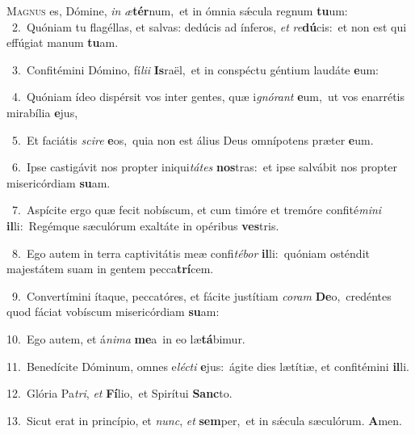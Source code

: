 \lettrine{\initial\textcolor{\initialcolor}{M}}{agnus} es, Dómine, \textit{in} \textit{æ}\-\textbf{tér}num,~\star et in ómnia sǽcula regnum \textbf{tu}\-um:\\
{\numbfont\textcolor{\numbcolor}{~2.}}~Quóniam tu flagéllas, et salvas: dedúcis ad ínferos, \textit{et} \textit{re}\-\textbf{dú}cis:~\star et non est qui effúgiat manum \textbf{tu}\-am.\par
{\numbfont\textcolor{\numbcolor}{~3.}}~Confitémini Dómino, fí\-\textit{li}\-\textit{i} \textbf{Is}\-raël,~\star et in conspéctu géntium laudáte \textbf{e}\-um:\par
{\numbfont\textcolor{\numbcolor}{~4.}}~Quóniam ídeo dispérsit vos inter gentes, quæ i\-\textit{gnó}\-\textit{rant} \textbf{e}\-um,~\star ut vos enarrétis mirabília \textbf{e}\-jus,\par
{\numbfont\textcolor{\numbcolor}{~5.}}~Et faciátis \textit{sci}\-\textit{re} \textbf{e}\-os,~\star quia non est álius Deus omnípotens præter \textbf{e}\-um.\par
{\numbfont\textcolor{\numbcolor}{~6.}}~Ipse castigávit nos propter iniqui\-\textit{tá}\-\textit{tes} \textbf{nos}\-tras:~\star et ipse salvábit nos propter misericórdiam \textbf{su}\-am.\par
{\numbfont\textcolor{\numbcolor}{~7.}}~Aspícite ergo quæ fecit nobíscum, et cum timóre et tremóre confité\-\textit{mi}\-\textit{ni} \textbf{il}\-li:~\star Regémque sæculórum exaltáte in opéribus \textbf{ves}\-tris.\par
{\numbfont\textcolor{\numbcolor}{~8.}}~Ego autem in terra captivitátis meæ confi\-\textit{té}\-\textit{bor} \textbf{il}\-li:~\star quóniam osténdit majestátem suam in gentem pecca\-\textbf{trí}\-cem.\par
{\numbfont\textcolor{\numbcolor}{~9.}}~Convertímini ítaque, peccatóres, et fácite justítiam \textit{co}\-\textit{ram} \textbf{De}\-o,~\star credéntes quod fáciat vobíscum misericórdiam \textbf{su}\-am:\par
{\numbfont\textcolor{\numbcolor}{10.}}~Ego autem, et á\-\textit{ni}\-\textit{ma} \textbf{me}\-a~\star in eo læ\-\textbf{tá}\-bimur.\par
{\numbfont\textcolor{\numbcolor}{11.}}~Benedícite Dóminum, omnes e\-\textit{léc}\-\textit{ti} \textbf{e}\-jus:~\star ágite dies lætítiæ, et confitémini \textbf{il}\-li.\par
{\numbfont\textcolor{\numbcolor}{12.}}~Glória Pa\-\textit{tri}\-, \textit{et} \textbf{Fí}\-lio,~\star et Spirítui \textbf{Sanc}\-to.\par
{\numbfont\textcolor{\numbcolor}{13.}}~Sicut erat in princípio, et \textit{nunc}\-, \textit{et} \textbf{sem}\-per,~\star et in sǽcula sæculórum. \textbf{A}\-men.\par
